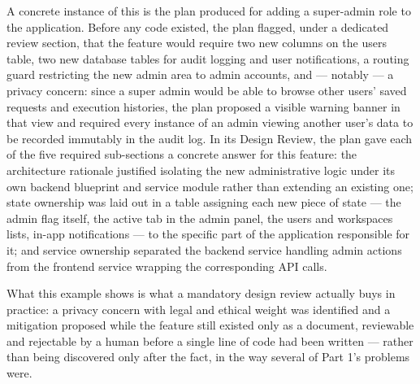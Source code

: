A concrete instance of this is the plan produced for adding a super-admin role to the application. Before any code existed, the plan flagged, under a dedicated review section, that the feature would require two new columns on the users table, two new database tables for audit logging and user notifications, a routing guard restricting the new admin area to admin accounts, and --- notably --- a privacy concern: since a super admin would be able to browse other users' saved requests and execution histories, the plan proposed a visible warning banner in that view and required every instance of an admin viewing another user's data to be recorded immutably in the audit log. In its Design Review, the plan gave each of the five required sub-sections a concrete answer for this feature: the architecture rationale justified isolating the new administrative logic under its own backend blueprint and service module rather than extending an existing one; state ownership was laid out in a table assigning each new piece of state --- the admin flag itself, the active tab in the admin panel, the users and workspaces lists, in-app notifications --- to the specific part of the application responsible for it; and service ownership separated the backend service handling admin actions from the frontend service wrapping the corresponding API calls.

What this example shows is what a mandatory design review actually buys in practice: a privacy concern with legal and ethical weight was identified and a mitigation proposed while the feature still existed only as a document, reviewable and rejectable by a human before a single line of code had been written --- rather than being discovered only after the fact, in the way several of Part 1's problems were.

